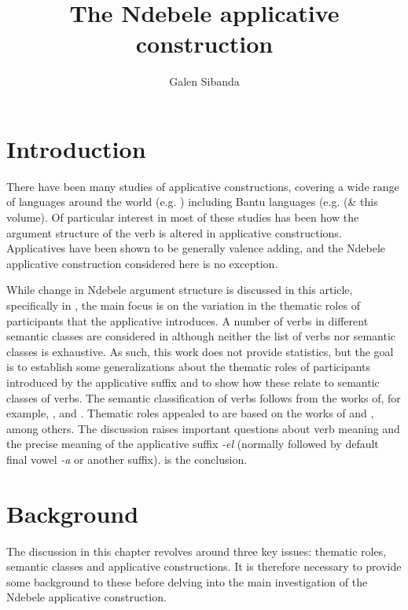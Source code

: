 \documentclass[output=paper]{langsci/langscibook}
\title{The Ndebele applicative construction}
\author{%
 Galen Sibanda \affiliation{Michigan State University} 
}
\begin{document}
\section{Introduction}\label{sec:sibanda:1}
There have been many studies of applicative constructions, covering a wide range of languages around the world (e.g. \citealt{Peterson2007}) including Bantu languages (e.g. \citealt{Ngonyani1996a,Mabugu2011,Jerro2016} (\& this volume). Of particular interest in most of these studies has been how the argument structure of the verb is altered in applicative constructions. Applicatives have been shown to be generally valence adding, and the Ndebele applicative construction considered here is no exception. 

 While change in Ndebele argument structure is discussed in this article, specifically in , the main focus is on the variation in the thematic roles of participants that the applicative introduces. A number of verbs in different semantic classes are considered in  although neither the list of verbs nor semantic classes is exhaustive. As such, this work does not provide statistics, but the goal is to establish some generalizations about the thematic roles of participants introduced by the applicative suffix and to show how these relate to semantic classes of verbs. The semantic classification of verbs follows from the works of, for example, \citet{Chafe1970,Dowty1987,Dowty1991,FoleyVanValin1984}, and \citet{Payne1997}. Thematic roles appealed to are based on the works of \citet{Frawley1992,Fillmore1968,Fillmore1977} and \citet{Halliday1970}, among others. The discussion raises important questions about verb meaning and the precise meaning of the applicative suffix \textit{-el} (normally followed by default final vowel \textit{-a} or another suffix).  is the conclusion.

\section{Background}\label{sec:sibanda:}

The discussion in this chapter revolves around three key issues: thematic roles, semantic classes and applicative constructions. It is therefore necessary to provide some background to these before delving into the main investigation of the Ndebele applicative construction. 
\end{document}
